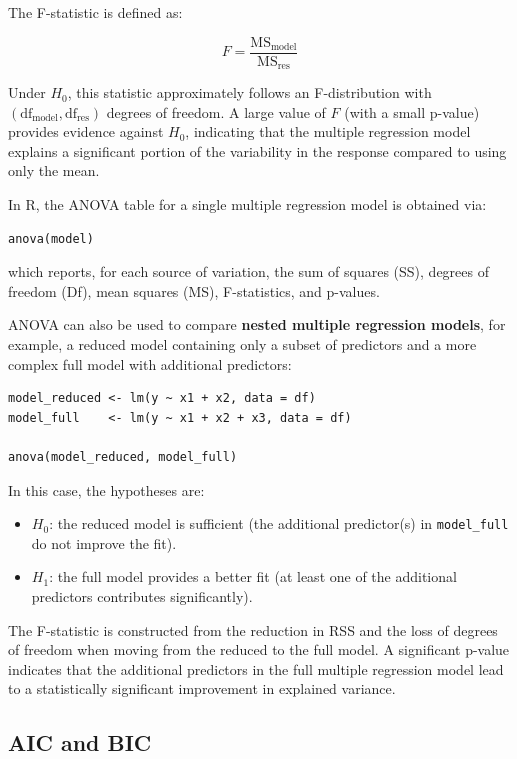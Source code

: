 The F-statistic is defined as:

\[
F = \frac{\text{MS}_{\text{model}}}{\text{MS}_{\text{res}}}
\]

Under $H_0$, this statistic approximately follows an F-distribution with $(\text{df}_{\text{model}}, \text{df}_{\text{res}})$ degrees of freedom. A large value of $F$ (with a small p-value) provides evidence against $H_0$, indicating that the multiple regression model explains a significant portion of the variability in the response compared to using only the mean.

In R, the ANOVA table for a single multiple regression model is obtained via:

\begin{verbatim}
anova(model)
\end{verbatim}

which reports, for each source of variation, the sum of squares (SS), degrees of freedom (Df), mean squares (MS), F-statistics, and p-values.

ANOVA can also be used to compare \textbf{nested multiple regression models}, for example, a reduced model containing only a subset of predictors and a more complex full model with additional predictors:

\begin{verbatim}
model_reduced <- lm(y ~ x1 + x2, data = df)
model_full    <- lm(y ~ x1 + x2 + x3, data = df)

anova(model_reduced, model_full)
\end{verbatim}

In this case, the hypotheses are:
\begin{itemize}
  \item $H_0$: the reduced model is sufficient (the additional predictor(s) in \texttt{model\_full} do not improve the fit).
  \item $H_1$: the full model provides a better fit (at least one of the additional predictors contributes significantly).
\end{itemize}


The F-statistic is constructed from the reduction in RSS and the loss of degrees of freedom when moving from the reduced to the full model. A significant p-value indicates that the additional predictors in the full multiple regression model lead to a statistically significant improvement in explained variance.



\subsection{AIC and BIC}

